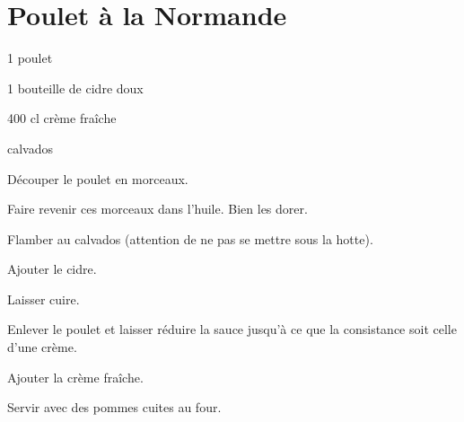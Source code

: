 \section[\normalsize{Poulet à la Normande}]{Poulet à la Normande}

\begin{ingredients}
\item 1 poulet 
\item 1 bouteille de cidre doux
\item	400 cl crème fraîche
\item	calvados
\end{ingredients}
\begin{infos}

\end{infos}
\begin{etapes}
\item D\'ecouper le poulet en morceaux.
\item Faire revenir ces morceaux dans l’huile.
Bien les dorer.
\item Flamber au calvados (attention de ne pas se mettre sous la hotte).
\item Ajouter le cidre.
\item Laisser cuire.
\item Enlever le poulet et laisser r\'eduire la sauce jusqu’\`a ce que la consistance soit celle d’une cr\`eme.
\item Ajouter la cr\`eme fra\^iche.
\item Servir avec des pommes cuites au four. 
\end{etapes}
\begin{conseils}
\end{conseils}